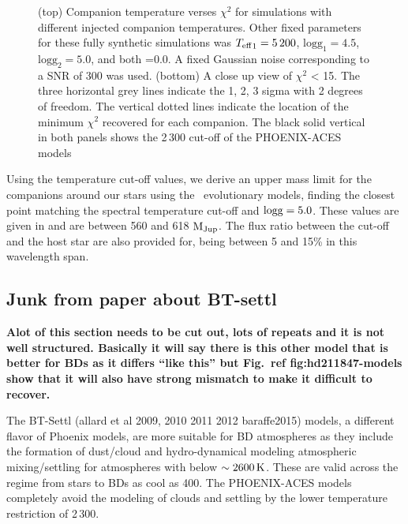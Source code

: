 \begin{figure}
    \centering
    \caption{(top) Companion temperature verses \(\chi^2\) for simulations with different injected companion temperatures. Other fixed parameters for these fully synthetic simulations was \({T_{\mathrm{eff}}}_{1}=5\,200\)\K{}, \(\textrm{logg}_1=4.5\), \(\textrm{logg}_2=5.0\), and both \feh{}=0.0. A fixed Gaussian noise corresponding to a {SNR} of 300 was used.
       (bottom) A close up view of \(\chi^2\) < 15. The three horizontal grey lines indicate the 1, 2, 3 sigma with 2 degrees of freedom. The vertical dotted lines indicate the location of the minimum \(\chi^2\) recovered for each companion. The black solid vertical in both panels shows the 2\,300\K{} cut-off of the {PHOENIX-ACES} models}
    \label{fig:injection_shape}
\end{figure}




Using the temperature cut-off values, we derive an upper mass limit for the companions around our stars using the~\citet{baraffe_new_2015} evolutionary models, finding the closest point matching the spectral temperature cut-off and \(\rm logg=5.0\). These values are given in  and are between 560 and 618 \(\rm M_{Jup}\). The flux ratio between the cut-off and the host star are also provided for, being between 5 and 15\% in this wavelength span.













\subsection{Junk from paper about BT-settl}


\textbf{Alot of this section needs to be cut out, lots of repeats and it is not well structured. Basically it will say there is this other model that is better for BDs as it differs ``like this'' but Fig.~\textbf{ref {fig:hd211847-models}} show that it will also have strong mismatch to make it difficult to recover.}

\label{bt-setll}
The {BT-Settl} (allard et al 2009, 2010 2011 2012 baraffe2015) models, a different flavor of Phoenix models, are more suitable for BD atmospheres as they include the formation of dust/cloud and hydro-dynamical modeling atmospheric mixing/settling for atmospheres with \teff{} below \(\sim2600\,\si{\kelvin}{}\). These are valid across the regime from stars to BDs as cool as 400\K{}. The {PHOENIX-ACES} models completely avoid the modeling of clouds and settling by the lower temperature restriction of 2\,300\K{}.

